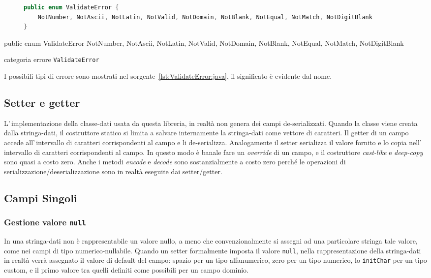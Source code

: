 \ifesource
\begin{figure*}[!htb]
\begin{lstlisting}[language=java, 
caption={categoria errore \texttt{ValidateError}}, 
label=lst:ValidateError:java]
public enum ValidateError {
    NotNumber, NotAscii, NotLatin, NotValid, NotDomain, NotBlank, NotEqual, NotMatch, NotDigitBlank
}
\end{lstlisting}
\end{figure*}
\else
\begin{elisting}[!htb]
\begin{javacode}
public enum ValidateError {
    NotNumber, NotAscii, NotLatin, NotValid, NotDomain, NotBlank, NotEqual, NotMatch, NotDigitBlank
}
\end{javacode}
\caption{categoria errore \texttt{ValidateError}}
\label{lst:ValidateError:java}
\end{elisting}
\fi

I possibili tipi di errore sono mostrati nel 
sorgente~\ref{lst:ValidateError:java}, il significato è evidente dal nome.

\subsection{Setter e getter}
L'\,implementazione della classe-dati usata da questa libreria, in realtà non 
genera dei campi de-serializzati. 
Quando la classe viene creata dalla stringa-dati, il costruttore statico si 
limita a salvare internamente la stringa-dati come vettore di caratteri. 
Il getter di un campo accede all'\,intervallo di caratteri corrispondenti al 
campo e li de-serializza. 
Analogamente il setter serializza il valore fornito e lo copia 
nell'\,intervallo di caratteri corrispondenti al campo. 
In questo modo è banale fare un \textsl{override} di un campo, e il 
costruttore \textit{cast-like} e \textit{deep-copy} sono quasi a costo zero.
Anche i metodi \textsl{encode} e \textsl{decode} sono sostanzialmente a costo 
zero perché le operazioni di serializzazione/deserializzazione sono in realtà 
eseguite dai setter/getter.

\subsection{Campi Singoli}
\subsubsection*{Gestione valore \texttt{null}}
In una stringa-dati non è rappresentabile un valore nullo, a meno che 
convenzionalmente si assegni ad una particolare stringa tale valore, come nei 
campi di tipo numerico-nullabile.
Quando un setter formalmente imposta il valore \texttt{null}, nella 
rappresentazione della stringa-dati in realtà verrà assegnato il valore di
default del campo: spazio per un tipo alfanumerico, zero per un tipo numerico,
lo \texttt{initChar} per un tipo custom, e il primo valore tra quelli definiti 
come possibili per un campo dominio.

